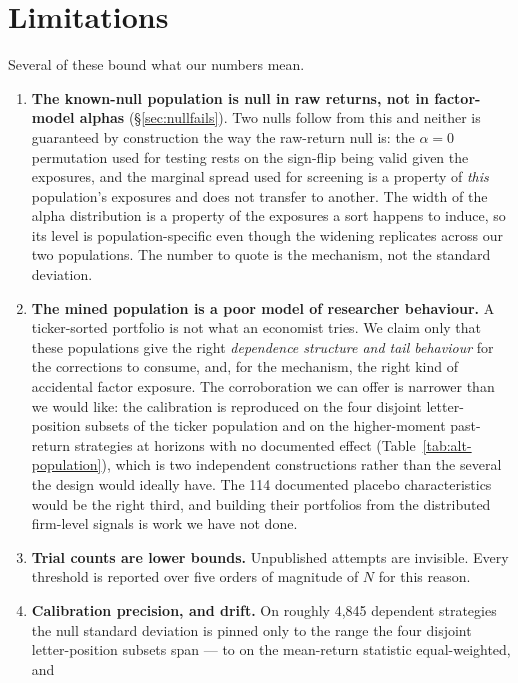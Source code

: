 \documentclass{article}
\begin{document}
\section{Limitations}
\label{sec:limitations}

Several of these bound what our numbers mean.

\begin{enumerate}\itemsep2pt
\item \textbf{The known-null population is null in raw returns, not in
factor-model alphas} (\S\ref{sec:nullfails}). Two nulls follow from this and
neither is guaranteed by construction the way the raw-return null is: the
$\alpha = 0$ permutation used for testing rests on the sign-flip being valid
given the exposures, and the marginal spread used for screening is a property
of \emph{this} population's exposures and does not transfer to another. The width of the alpha distribution is a property
of the exposures a sort happens to induce, so its level is population-specific
even though the widening replicates across our two populations. The number to
quote is the mechanism, not the standard deviation.
\item \textbf{The mined population is a poor model of researcher behaviour.} A
ticker-sorted portfolio is not what an economist tries. We claim only that
these populations give the right \emph{dependence structure and tail
behaviour} for the corrections to consume, and, for the mechanism, the right
kind of accidental factor exposure. The corroboration we can offer is
narrower than we would like: the calibration is reproduced on the four disjoint
letter-position subsets of the ticker population and on the higher-moment
past-return strategies at horizons with no documented effect
(Table~\ref{tab:alt-population}), which is two independent constructions rather
than the several the design would ideally have. The 114 documented placebo
characteristics would be the right third, and building their portfolios from
the distributed firm-level signals is work we have not done.
\item \textbf{Trial counts are lower bounds.} Unpublished attempts are
invisible. Every threshold is reported over five orders of magnitude of $N$ for
this reason.
\item \textbf{Calibration precision, and drift.} On roughly 4{,}845 dependent
strategies the null standard deviation is pinned only to the range the four
disjoint letter-position subsets span --- \bzoosubpopSdLowEw{} to
\bzoosubpopSdHighEw{} on the mean-return statistic equal-weighted, and

\end{enumerate}
\end{document}
